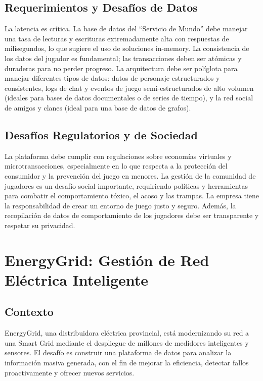 \documentclass[12pt]{article}
\begin{document}
\subsection{Requerimientos y Desafíos de Datos}
La latencia es crítica. La base de datos del ``Servicio de Mundo'' debe manejar una tasa de lecturas y escrituras extremadamente alta con respuestas de milisegundos, lo que sugiere el uso de soluciones in-memory. La consistencia de los datos del jugador es fundamental; las transacciones deben ser atómicas y duraderas para no perder progreso. La arquitectura debe ser políglota para manejar diferentes tipos de datos: datos de personaje estructurados y consistentes, logs de chat y eventos de juego semi-estructurados de alto volumen (ideales para bases de datos documentales o de series de tiempo), y la red social de amigos y clanes (ideal para una base de datos de grafos).

\subsection{Desafíos Regulatorios y de Sociedad}
La plataforma debe cumplir con regulaciones sobre economías virtuales y microtransacciones, especialmente en lo que respecta a la protección del consumidor y la prevención del juego en menores. La gestión de la comunidad de jugadores es un desafío social importante, requiriendo políticas y herramientas para combatir el comportamiento tóxico, el acoso y las trampas. La empresa tiene la responsabilidad de crear un entorno de juego justo y seguro. Además, la recopilación de datos de comportamiento de los jugadores debe ser transparente y respetar su privacidad.

\newpage

\section{EnergyGrid: Gestión de Red Eléctrica Inteligente}

\subsection{Contexto}
EnergyGrid, una distribuidora eléctrica provincial, está modernizando su red a una Smart Grid mediante el despliegue de millones de medidores inteligentes y sensores. El desafío es construir una plataforma de datos para analizar la información masiva generada, con el fin de mejorar la eficiencia, detectar fallos proactivamente y ofrecer nuevos servicios.
\end{document}

